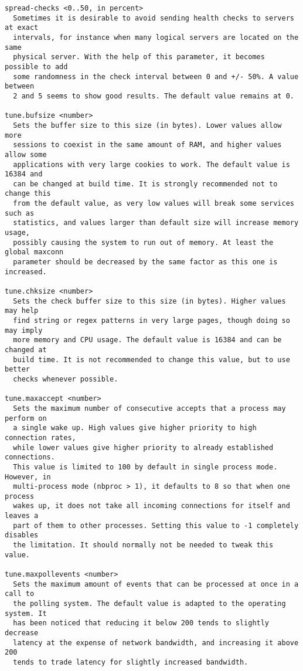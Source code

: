 \begin{verbatim}
spread-checks <0..50, in percent>
  Sometimes it is desirable to avoid sending health checks to servers at exact
  intervals, for instance when many logical servers are located on the same
  physical server. With the help of this parameter, it becomes possible to add
  some randomness in the check interval between 0 and +/- 50%. A value between
  2 and 5 seems to show good results. The default value remains at 0.

tune.bufsize <number>
  Sets the buffer size to this size (in bytes). Lower values allow more
  sessions to coexist in the same amount of RAM, and higher values allow some
  applications with very large cookies to work. The default value is 16384 and
  can be changed at build time. It is strongly recommended not to change this
  from the default value, as very low values will break some services such as
  statistics, and values larger than default size will increase memory usage,
  possibly causing the system to run out of memory. At least the global maxconn
  parameter should be decreased by the same factor as this one is increased.

tune.chksize <number>
  Sets the check buffer size to this size (in bytes). Higher values may help
  find string or regex patterns in very large pages, though doing so may imply
  more memory and CPU usage. The default value is 16384 and can be changed at
  build time. It is not recommended to change this value, but to use better
  checks whenever possible.

tune.maxaccept <number>
  Sets the maximum number of consecutive accepts that a process may perform on
  a single wake up. High values give higher priority to high connection rates,
  while lower values give higher priority to already established connections.
  This value is limited to 100 by default in single process mode. However, in
  multi-process mode (nbproc > 1), it defaults to 8 so that when one process
  wakes up, it does not take all incoming connections for itself and leaves a
  part of them to other processes. Setting this value to -1 completely disables
  the limitation. It should normally not be needed to tweak this value.

tune.maxpollevents <number>
  Sets the maximum amount of events that can be processed at once in a call to
  the polling system. The default value is adapted to the operating system. It
  has been noticed that reducing it below 200 tends to slightly decrease
  latency at the expense of network bandwidth, and increasing it above 200
  tends to trade latency for slightly increased bandwidth.


\end{verbatim}
